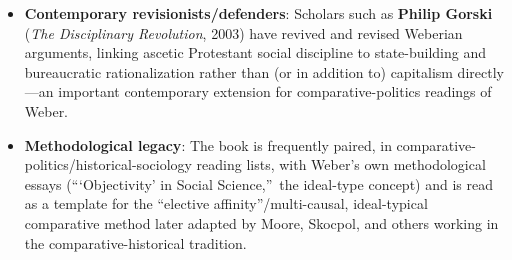 \documentclass[12pt]{article}
\begin{document}
\begin{itemize}[leftmargin=*, itemsep=4pt]
    \item \textbf{Contemporary revisionists/defenders}: Scholars such as \textbf{Philip Gorski} (\textit{The Disciplinary Revolution}, 2003) have revived and revised Weberian arguments, linking ascetic Protestant social discipline to state-building and bureaucratic rationalization rather than (or in addition to) capitalism directly---an important contemporary extension for comparative-politics readings of Weber.
    \item \textbf{Methodological legacy}: The book is frequently paired, in comparative-politics/historical-sociology reading lists, with Weber's own methodological essays (```Objectivity' in Social Science,''\ the ideal-type concept) and is read as a template for the ``elective affinity''/multi-causal, ideal-typical comparative method later adapted by Moore, Skocpol, and others working in the comparative-historical tradition.
\end{itemize}
\end{document}
